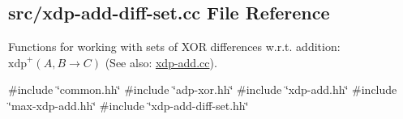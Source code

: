 \hypertarget{xdp-add-diff-set_8cc}{\subsection{src/xdp-\/add-\/diff-\/set.cc \-File \-Reference}
\label{xdp-add-diff-set_8cc}
}


\-Functions for working with sets of \-X\-O\-R differences w.\-r.\-t. addition\-: $\mathrm{xdp}^{+}(A,B \rightarrow C)$ (\-See also\-: \hyperlink{xdp-add_8cc}{xdp-\/add.\-cc}).  


{\ttfamily \#include \char`\"{}common.\-hh\char`\"{}}\*
{\ttfamily \#include \char`\"{}adp-\/xor.\-hh\char`\"{}}\*
{\ttfamily \#include \char`\"{}xdp-\/add.\-hh\char`\"{}}\*
{\ttfamily \#include \char`\"{}max-\/xdp-\/add.\-hh\char`\"{}}\*
{\ttfamily \#include \char`\"{}xdp-\/add-\/diff-\/set.\-hh\char`\"{}}\*
